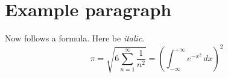 \documentclass[a4paper]{article}
\begin{document}
 
\section{Example paragraph} 
Now follows a formula. Here be \textit{italic}.
\[ 
\pi = \sqrt{6\sum_{n=1}^{\infty}\frac{1}{n^2}}
   = \left(\int_{-\infty}^{+\infty}e^{-x^2}\,dx\right)^2
\] 
\end{document}
